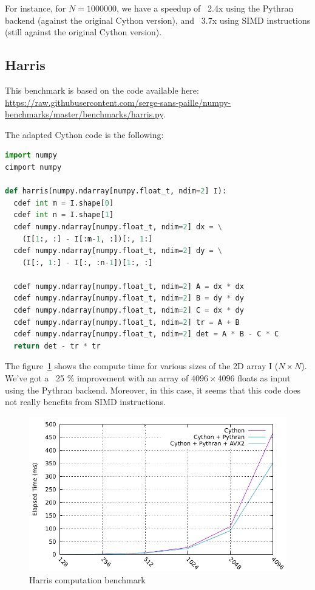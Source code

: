 \documentclass{deliverablereport}
\begin{document}
For instance, for $N = 1000000$, we have a speedup of ~2.4x using the Pythran
backend (against the original Cython version), and ~3.7x using SIMD
instructions (still against the original Cython version).

\subsection{Harris}

This benchmark is based on the code available here:
\url{https://raw.githubusercontent.com/serge-sans-paille/numpy-benchmarks/master/benchmarks/harris.py}.

The adapted Cython code is the following:

\begin{lstlisting}[language=python]
import numpy
cimport numpy

def harris(numpy.ndarray[numpy.float_t, ndim=2] I):
  cdef int m = I.shape[0]
  cdef int n = I.shape[1]
  cdef numpy.ndarray[numpy.float_t, ndim=2] dx = \
    (I[1:, :] - I[:m-1, :])[:, 1:]
  cdef numpy.ndarray[numpy.float_t, ndim=2] dy = \
    (I[:, 1:] - I[:, :n-1])[1:, :]

  cdef numpy.ndarray[numpy.float_t, ndim=2] A = dx * dx
  cdef numpy.ndarray[numpy.float_t, ndim=2] B = dy * dy
  cdef numpy.ndarray[numpy.float_t, ndim=2] C = dx * dy
  cdef numpy.ndarray[numpy.float_t, ndim=2] tr = A + B
  cdef numpy.ndarray[numpy.float_t, ndim=2] det = A * B - C * C
  return det - tr * tr
\end{lstlisting}

The figure~\ref{fig:harris_bench} shows the compute time for various sizes of
the 2D array I ($N \times N$). We've got a ~25 \% improvement with an array of
$4096 \times 4096$ floats as input using the Pythran backend. Moreover, in this
case, it seems that this code does not really benefits from SIMD instructions.

\begin{figure}[h]
  \caption{\label{fig:harris_bench} Harris computation benchmark}
  \includegraphics{benchs/harris/graph.pdf}
\end{figure}
\end{document}
